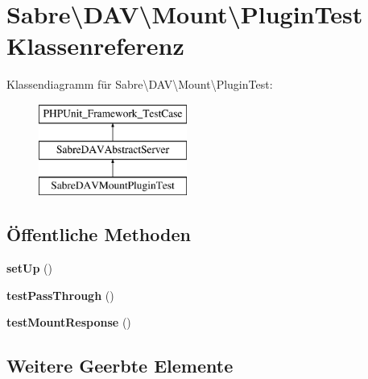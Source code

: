 \hypertarget{class_sabre_1_1_d_a_v_1_1_mount_1_1_plugin_test}{}\section{Sabre\textbackslash{}D\+AV\textbackslash{}Mount\textbackslash{}Plugin\+Test Klassenreferenz}
\label{class_sabre_1_1_d_a_v_1_1_mount_1_1_plugin_test}
Klassendiagramm für Sabre\textbackslash{}D\+AV\textbackslash{}Mount\textbackslash{}Plugin\+Test\+:\begin{figure}[H]
\begin{center}
\leavevmode
\includegraphics[height=3.000000cm]{class_sabre_1_1_d_a_v_1_1_mount_1_1_plugin_test}
\end{center}
\end{figure}
\subsection*{Öffentliche Methoden}
\begin{DoxyCompactItemize}
\item 
\mbox{\label{class_sabre_1_1_d_a_v_1_1_mount_1_1_plugin_test_af22e278dab099b53591c2a6989ef8cd1}} 
{\bfseries set\+Up} ()
\item 
\mbox{\label{class_sabre_1_1_d_a_v_1_1_mount_1_1_plugin_test_ab3ff9249c21c0f901d5f51912bb845e9}} 
{\bfseries test\+Pass\+Through} ()
\item 
\mbox{\label{class_sabre_1_1_d_a_v_1_1_mount_1_1_plugin_test_a03cadfd818fac983a225cfbb9b956b29}} 
{\bfseries test\+Mount\+Response} ()
\end{DoxyCompactItemize}
\subsection*{Weitere Geerbte Elemente}


